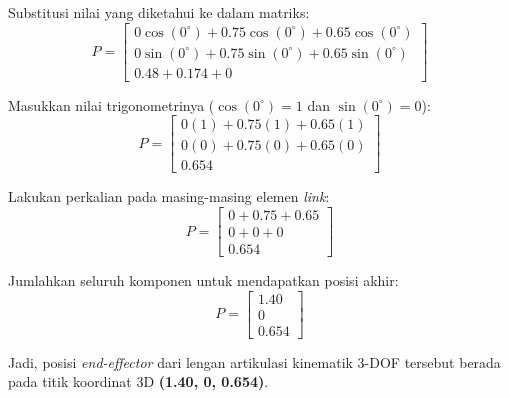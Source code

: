 \documentclass[12pt, a4paper, bahasa]{article}
\begin{document}
Substitusi nilai yang diketahui ke dalam matriks:
\begin{equation}
P = \begin{bmatrix} 
0 \cos(0^\circ) + 0.75 \cos(0^\circ) + 0.65 \cos(0^\circ) \\ 
0 \sin(0^\circ) + 0.75 \sin(0^\circ) + 0.65 \sin(0^\circ) \\
0.48 + 0.174 + 0
\end{bmatrix}
\end{equation}

Masukkan nilai trigonometrinya ($\cos(0^\circ) = 1$ dan $\sin(0^\circ) = 0$):
\begin{equation}
P = \begin{bmatrix} 
0(1) + 0.75(1) + 0.65(1) \\ 
0(0) + 0.75(0) + 0.65(0) \\
0.654
\end{bmatrix}
\end{equation}

Lakukan perkalian pada masing-masing elemen \textit{link}:
\begin{equation}
P = \begin{bmatrix} 
0 + 0.75 + 0.65 \\ 
0 + 0 + 0 \\
0.654
\end{bmatrix}
\end{equation}

Jumlahkan seluruh komponen untuk mendapatkan posisi akhir:
\begin{equation}
P = \begin{bmatrix} 
1.40 \\ 
0 \\
0.654
\end{bmatrix}
\end{equation}

Jadi, posisi \textit{end-effector} dari lengan artikulasi kinematik 3-DOF tersebut berada pada titik koordinat 3D \textbf{(1.40, 0, 0.654)}.

\end{document}
